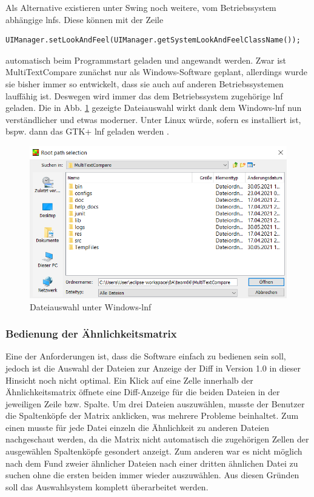 Als Alternative existieren unter Swing noch weitere, vom Betriebssystem abhängige \acrshort{lnf}s. Diese können mit der Zeile
\begin{verbatim}
UIManager.setLookAndFeel(UIManager.getSystemLookAndFeelClassName());
\end{verbatim}
automatisch beim Programmstart geladen und angewandt werden. Zwar ist MultiTextCompare zunächst nur als Windows-Software geplant, allerdings wurde sie bisher immer so entwickelt, dass sie auch auf anderen Betriebssystemen lauffähig ist. Deswegen wird immer das dem Betriebssystem zugehörige \acrshort{lnf} geladen. Die in Abb. \ref{fig:windowsFileSelection} gezeigte Dateiauswahl wirkt dank dem Windows-\acrshort{lnf} nun verständlicher und etwas moderner. Unter Linux würde, sofern es installiert ist, bspw. dann das GTK+ \acrshort{lnf} geladen werden \autocite{lookAndFeel}.

\begin{figure}[!htb]
    \centering
    \includegraphics[scale=0.8]{images/windowsFileSelection.png}
    \caption{Dateiauswahl unter Windows-\acrshort{lnf}}
    \label{fig:windowsFileSelection}
\end{figure}

\newpage\subsubsection{Bedienung der Ähnlichkeitsmatrix}

Eine der Anforderungen ist, dass die Software einfach zu bedienen sein soll, jedoch ist die Auswahl der Dateien zur Anzeige der Diff in Version 1.0 in dieser Hinsicht noch nicht optimal. Ein Klick auf eine Zelle innerhalb der Ähnlichkeitsmatrix öffnete eine Diff-Anzeige für die beiden Dateien in der jeweiligen Zeile bzw. Spalte. Um drei Dateien auszuwählen, musste der Benutzer die Spaltenköpfe der Matrix anklicken, was mehrere Probleme beinhaltet. Zum einen musste für jede Datei einzeln die Ähnlichkeit zu anderen Dateien nachgeschaut werden, da die Matrix nicht automatisch die zugehörigen Zellen der ausgewählen Spaltenköpfe gesondert anzeigt. Zum anderen war es nicht möglich nach dem Fund zweier ähnlicher Dateien nach einer dritten ähnlichen Datei zu suchen ohne die ersten beiden immer wieder auszuwählen. Aus diesen Gründen soll das Auswahlsystem komplett überarbeitet werden.

